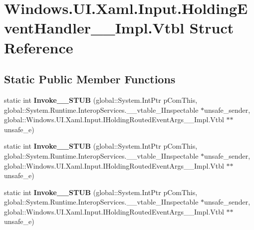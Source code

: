 \hypertarget{struct_windows_1_1_u_i_1_1_xaml_1_1_input_1_1_holding_event_handler_____impl_1_1_vtbl}{}\section{Windows.\+U\+I.\+Xaml.\+Input.\+Holding\+Event\+Handler\+\_\+\+\_\+\+Impl.\+Vtbl Struct Reference}
\label{struct_windows_1_1_u_i_1_1_xaml_1_1_input_1_1_holding_event_handler_____impl_1_1_vtbl}
\subsection*{Static Public Member Functions}
\begin{DoxyCompactItemize}
\item 
\mbox{\label{struct_windows_1_1_u_i_1_1_xaml_1_1_input_1_1_holding_event_handler_____impl_1_1_vtbl_a854108e9622b69f9fd8588e3d91402cd}} 
static int {\bfseries Invoke\+\_\+\+\_\+\+S\+T\+UB} (global\+::\+System.\+Int\+Ptr p\+Com\+This, global\+::\+System.\+Runtime.\+Interop\+Services.\+\_\+\+\_\+vtable\+\_\+\+I\+Inspectable $\ast$unsafe\+\_\+sender, global\+::\+Windows.\+U\+I.\+Xaml.\+Input.\+I\+Holding\+Routed\+Event\+Args\+\_\+\+\_\+\+Impl.\+Vtbl $\ast$$\ast$unsafe\+\_\+e)
\item 
\mbox{\label{struct_windows_1_1_u_i_1_1_xaml_1_1_input_1_1_holding_event_handler_____impl_1_1_vtbl_a854108e9622b69f9fd8588e3d91402cd}} 
static int {\bfseries Invoke\+\_\+\+\_\+\+S\+T\+UB} (global\+::\+System.\+Int\+Ptr p\+Com\+This, global\+::\+System.\+Runtime.\+Interop\+Services.\+\_\+\+\_\+vtable\+\_\+\+I\+Inspectable $\ast$unsafe\+\_\+sender, global\+::\+Windows.\+U\+I.\+Xaml.\+Input.\+I\+Holding\+Routed\+Event\+Args\+\_\+\+\_\+\+Impl.\+Vtbl $\ast$$\ast$unsafe\+\_\+e)
\item 
\mbox{\label{struct_windows_1_1_u_i_1_1_xaml_1_1_input_1_1_holding_event_handler_____impl_1_1_vtbl_a854108e9622b69f9fd8588e3d91402cd}} 
static int {\bfseries Invoke\+\_\+\+\_\+\+S\+T\+UB} (global\+::\+System.\+Int\+Ptr p\+Com\+This, global\+::\+System.\+Runtime.\+Interop\+Services.\+\_\+\+\_\+vtable\+\_\+\+I\+Inspectable $\ast$unsafe\+\_\+sender, global\+::\+Windows.\+U\+I.\+Xaml.\+Input.\+I\+Holding\+Routed\+Event\+Args\+\_\+\+\_\+\+Impl.\+Vtbl $\ast$$\ast$unsafe\+\_\+e)
$$
\end{DoxyCompactItemize}
